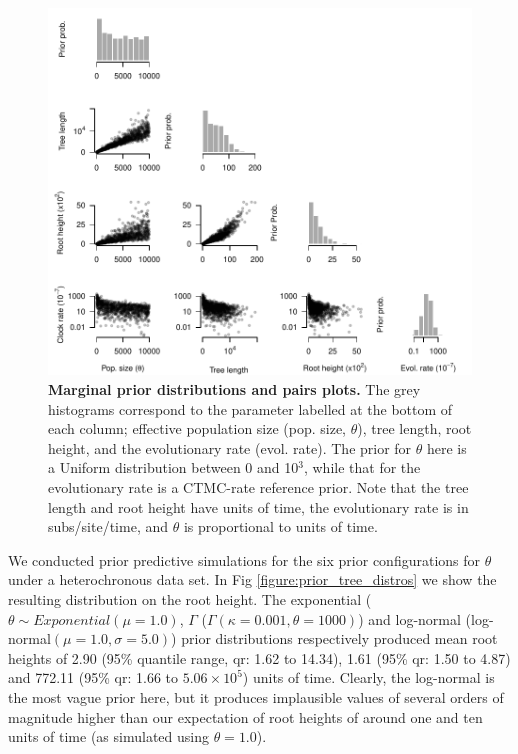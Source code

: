 \documentclass[10pt,letterpaper]{article}
\begin{document}
\begin{figure}[!h]
		\begin{center}
		\includegraphics[width=14.7cm]{figure_5.pdf}\newline			
		\vspace{-0.5cm}
  \newline
		\caption{\textbf{Marginal prior distributions and pairs plots.} The grey histograms correspond to the parameter labelled at the bottom of each column; effective population size (pop. size, $\theta$), tree length, root height, and the evolutionary rate (evol. rate). The prior for $\theta$ here is a Uniform distribution between 0 and 10$^3$, while that for the evolutionary rate is a CTMC-rate reference prior. Note that the tree length and root height have units of time, the evolutionary rate is in subs/site/time, and $\theta$ is proportional to units of time. }
        \label{figure:correlation_plots}
		\end{center}
\end{figure}

We conducted prior predictive simulations for the six prior configurations for $\theta$ under a heterochronous data set. In Fig \ref{figure:prior_tree_distros} we show the resulting distribution on the root height. The exponential ($\theta \sim Exponential(\mu=1.0)$, $\Gamma$ ($\Gamma(\kappa=0.001, \theta=1000)$) and log-normal (log-normal$(\mu=1.0, \sigma=5.0)$) prior distributions respectively produced mean root heights of 2.90 (95\% quantile range, qr: 1.62 to 14.34), 1.61 (95\% qr: 1.50 to 4.87) and 772.11 (95\% qr: 1.66 to $5.06 \times 10^5$) units of time. Clearly, the log-normal is the most vague prior here, but it produces implausible values of several orders of magnitude higher than our expectation of root heights of around one and ten units of time (as simulated using $\theta=1.0$).
\end{document}
